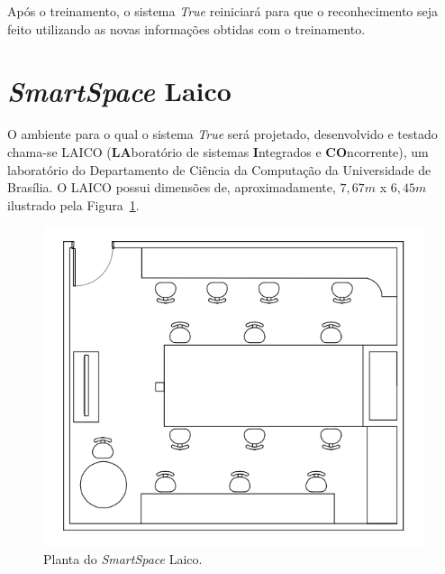 	Após o treinamento, o sistema \textit{True} reiniciará para que o reconhecimento seja feito utilizando as novas informações obtidas com o treinamento.

\section{\textit{SmartSpace} Laico}

	O ambiente para o qual o sistema \textit{True} será projetado, desenvolvido e testado chama-se LAICO (\textbf{LA}boratório de sistemas \textbf{I}ntegrados e \textbf{CO}ncorrente), um laboratório do Departamento de Ciência da Computação da Universidade de Brasília. O LAICO possui dimensões de, aproximadamente,  $\displaystyle 7,67m$ x $\displaystyle 6,45m$ ilustrado pela Figura~\ref{fig:laico}.

	\begin{figure}[hbt]
			\begin{center}
				\includegraphics[scale=0.6]{figuras/4.ProblemaEProposta/laico.png}
			\end{center}
			\caption{Planta do \textit{SmartSpace} Laico.}
			\label{fig:laico}
		\end{figure}	














